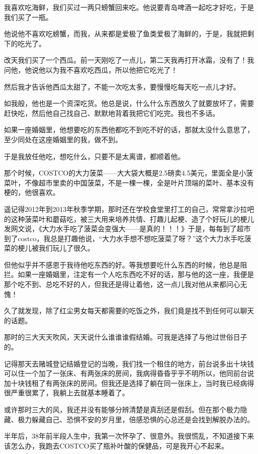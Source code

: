 \documentclass[9pt, b5paper]{article}
\begin{document}
我喜欢吃海鲜，我们买过一两只螃蟹回来吃。他说要青岛啤酒一起吃才好吃，于是我们买了一瓶。

他说他不喜欢吃螃蟹，而我，从来都是爱极了鱼类爱极了海鲜的，于是，我就把剩下的吃光了。

改天我们买了一个西瓜。前一天刚吃了一点儿，第二天我再打开冰霜，没有了！我问他，他说他以为我不喜欢吃西瓜，所以他把它吃光了！

然后我才告诉他西瓜太甜了，不能一次吃太多，要慢慢吃每天吃一点儿才好。

如我般，他也是一个资深吃货。他总是说，什么什么东西放久了就要放坏了，需要赶快吃，然后他自己找自己、默默地背着我把它们吃完。我也不多话。

如果一座婚姻里，他想要吃的东西他都吃不到吃不好的话，那就太没什么意思了，至少同处在这座婚姻里的我，做不到。

于是我放任他吃，想吃什么，只要不是太离谱，都顺着他。

那个时候，COSTCO的大力菠菜——大大袋大概是2.5磅卖4.5美元，里面全是小菠菜叶，不像超市里卖的中国菠菜，不是一棵一棵，全是叶片顶端的菜叶、基本没有梗的，他很喜欢。

遥记得2012年到2013年秋季学期，那时还在学校食堂里打工的自己，常常拿沙拉吧的这种菠菜叶和蘑菇吃，被三大用来培养共情、打趣儿起梗、造了个好玩儿的梗儿发网文说，《大力水手吃了菠菜会变强大——是真的！！！》于是，每每到了超市到了costco，我总是打趣他说，“大力水手想不想吃菠菜了呀？”这个大力水手吃菠菜的梗儿被我们玩儿了很久。

但他似乎并不感恩于我待他吃东西的好。等我想要吃什么东西的时候，他总是阻拦。如果一座婚姻里，注定有一个人吃东西吃不好的话，那与他的这一座，我便是那个吃不到、总吃不好的人，但我还是得让着他，这一点儿我对他从来都问心无愧！

久了就发现，除了红尘男女每天都需要的吃饭之外，我们竟是找不到任何可以聊天的话题。

那时的三大天天吹风，天天说什么谁谁谁假结婚。可我是选择了与他过世俗日子的。

记得那天去赌城登记结婚登记的当晚，我们找一个租住的地方，前台说多出十块钱可以住一个加了一张床、有两张床的房间，我病得昏昏乎乎不明所以，他同前台说加十块钱租了有两张床的房间。但我还是选择了躺在同一张床上，当时我已经病得很严重很累了，我躺上去就基本睡着了。

或许那时三大的风，我还并没有能够分辨清楚是真刮还是假刮。但在那个极力隐藏、极力躲藏自己、恐惧不安的岁月里，倍感恐惧的心总还是会找到解脱办法的。

半年后，38年前半段人生中，我第一次怀孕了、很意外。我很慌乱，不知道接下来该怎么办，我跑去COSTCO买了瓶补叶酸的保健品，可是我开心不起来。
\end{document}
